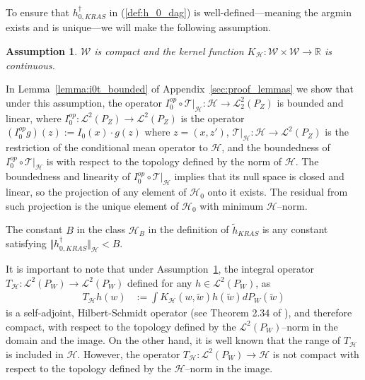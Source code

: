 \documentclass[twoside,11pt]{article}
\newtheorem{assumption}{Assumption}
\newcommand{\E}{\mathbb{E}}
\newcommand{\mc}{\mathcal}
\begin{document}
To ensure that $h_{0,KRAS}^\dagger$ in (\ref{def:h_0_dag}) is well-defined---meaning the argmin exists and is unique---we will make the following assumption.
\begin{assumption} 
$\mc{W}$ is compact and the kernel function $K_{\mc{H}}:\mc{W}\times\mc{{W}}\rightarrow\mathbb{R}$ is continuous.\label{ass:K_H}
\end{assumption}
In Lemma~\ref{lemma:i0t_bounded} of Appendix~\ref{sec:proof_lemmas} we show that under this assumption, the operator $I_0^{op}\circ\mc{T}\vert_\mc{H}: \mc{H} \rightarrow \mc{L}^2_2{(P_Z)} $ is bounded and linear, where $I_0^{op}:\mc{L}^2(P_{Z})\rightarrow\mc{L}^2(P_{Z})$ is the operator $\left(I_0^{op}g\right)(z):=I_0(x)\cdot g(z)$ where $ z=(x,z')$, $\mc{T}\vert_\mc{H}:\mc{H} \rightarrow \mc{L}^2(P_{Z})$ is the restriction of the conditional mean operator to $\mc{H}$, and the boundedness of $I_0^{op}\circ\mc{T}\vert_\mc{H}$ is with respect to the topology defined by the norm of $\mc{H}$. The boundedness and linearity of $I_0^{op}\circ\mc{T}\vert_\mc{H}$ implies that its null space is closed and linear, so the projection of any element of $\mc{H}_0$ onto it exists. The residual from such projection is the unique element of $\mc{H}_0$ with minimum $\mc{H}$--norm.

The constant $B$ in the class $\mc{H}_B$ in the definition of $\tilde{h}_{KRAS}$ is any constant satisfying $\Vert h_{0,KRAS}^\dag \Vert_\mc{H} < B$.


It is important to note that under Assumption~\ref{ass:K_H}, the integral operator $T_{\mc{H}}:\mathcal{L}^2(P_{W})\rightarrow\mathcal{L}^2(P_{W})$ defined for any $h \in \mathcal{L}^2(P_{W})$, as 
\begin{align}
    T_{\mc{H}}h(w)&:=\int K_{\mc{H}}\left(w,\tilde w\right)h(\tilde w)dP_{W}(\tilde w) \label{def:int_op}
\end{align}
is a self-adjoint, Hilbert-Schmidt operator (see Theorem 2.34 of \cite{carrasco2007linear}), and therefore compact, with respect to the topology defined by the $\mc{L}^2(P_{W})$--norm in the domain and the image. On the other hand, it is well known that the range of $T_{\mc{H}}$ is included in $\mc{H}$. However, the operator $T_{\mc{H}}:\mathcal{L}^2(P_{W})\rightarrow \mc{H}$ is not compact with respect to the topology defined by the $\mc{H}$--norm in the image.

\end{document}
